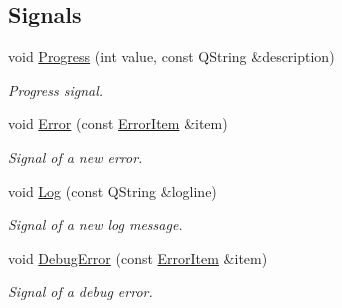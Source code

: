 \subsection*{Signals}
\begin{DoxyCompactItemize}
\item 
void \hyperlink{class_thread_result_acfbac907ecb42e737f646334afd1a90a}{Progress} (int value, const Q\-String \&description)
\begin{DoxyCompactList}\small\item\em Progress signal. \end{DoxyCompactList}\item 
void \hyperlink{class_thread_result_a079507757d561abd876d546548e1afc0}{Error} (const \hyperlink{class_error_item}{Error\-Item} \&item)
\begin{DoxyCompactList}\small\item\em Signal of a new error. \end{DoxyCompactList}\item 
void \hyperlink{class_thread_result_a01e6c8e662ba4da9c4828ce5bb134a00}{Log} (const Q\-String \&logline)
\begin{DoxyCompactList}\small\item\em Signal of a new log message. \end{DoxyCompactList}\item 
void \hyperlink{class_thread_result_a2bf2f5f36505cb0a45ca4ecfb83f7f29}{Debug\-Error} (const \hyperlink{class_error_item}{Error\-Item} \&item)
\begin{DoxyCompactList}\small\item\em Signal of a debug error. \end{DoxyCompactList}\end{DoxyCompactItemize}
